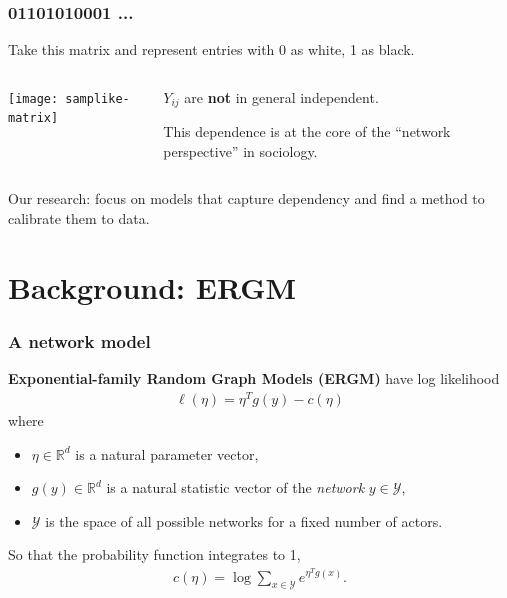\documentclass[ 10pt]{beamer}
\def\RR{{\mathbb R}}
\def\YY{{\mathcal Y}}
\newcommand{\fatdot}{\,\cdot\,}
\newcommand{\inner}[1]{\langle #1 \rangle}
\begin{document}
{
\frametitle{01101010001 ...}
Take this matrix and represent entries with 0 as white, 1 as black.
\begin{columns}[T]
\begin{column}[T]{0.4\textwidth}
\texttt{[image: samplike-matrix]}
\end{column}
\pause
\begin{column}[T]{0.6\textwidth}
\vspace{5mm}

$Y_{ij}$ are \textbf{not} in general independent.
\vspace{2mm}

This dependence is at the core of the ``network perspective'' in sociology.
\end{column}
\end{columns}
\vspace{2mm}

\pause
\vspace{1mm}




\begin{block}{}
Our research: focus on models that capture dependency and find a method to calibrate them to data.
\end{block}
}
\section{Background: ERGM}
\frame
{
\frametitle{A network model}


\textbf{Exponential-family Random Graph Models (ERGM)} have log likelihood
\begin{align*}%
	\ell( \eta) = \eta^T g(y) - c(\eta)
\end{align*}
where 
\begin{itemize}
\item $\eta \in \RR^d$ is a natural parameter vector,
\item $g(y)\in\RR^d$ is a natural statistic vector of the \emph{network} $y\in \YY$,
\item $\YY$ is the space of all possible networks for a fixed number of actors.
\end{itemize}
\vspace{2mm}

So that the probability function integrates to 1,
\begin{align*}
	c(\eta) = \log \sum_{x \in \YY} e^{\eta^T g(x) }.
\end{align*}
}
\end{document}
